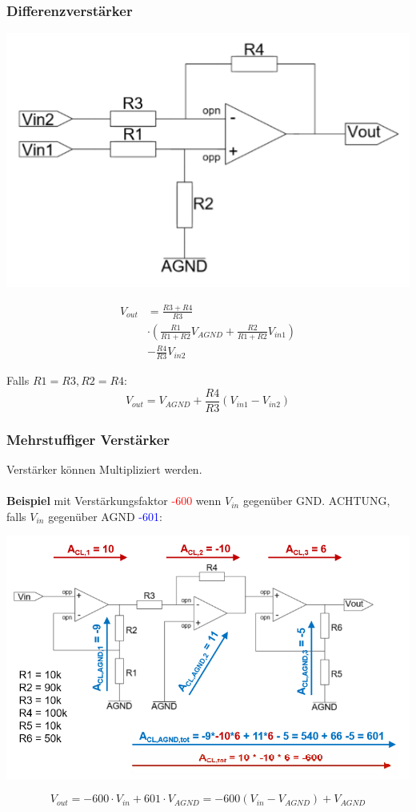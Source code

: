 \subsubsection{Differenzverstärker}
\begin{minipage}{0.20\textwidth}
	\includegraphics[width=\linewidth,keepaspectratio=true]{./Images/opamp_differenz}
\end{minipage}%
\begin{minipage}{0.30\textwidth}
	\begin{align*}
		V_{out} &= \frac{R3 +  R4}{R3} \\ &\cdot \left(\frac{R1}{R1 + R2}V_{AGND} + \frac{R2}{R1 + R2}V_{in1}\right) \\ &- \frac{R4}{R3}V_{in2}
	\end{align*}
\end{minipage}

Falls $R1=R3, R2=R4$: \[ V_{out} = V_{AGND}+ \frac{R4}{R3}(V_{in1} - V_{in2}) \]
 
\subsubsection{Mehrstuffiger Verstärker}
Verstärker können Multipliziert werden. \\
~\\\textbf{Beispiel }mit Verstärkungsfaktor \textcolor{red}{-600} wenn $V_{in}$ gegenüber GND. ACHTUNG, falls $V_{in}$ gegenüber AGND \textcolor{blue}{-601}:\\
\begin{center}
	\includegraphics[width=0.8\linewidth]{Images/opamp_mehrstufig}
\end{center}
\[
V_{out} = -600\cdot V_{in} + 601\cdot V_{AGND} = -600(V_{in} - V_{AGND}) + V_{AGND}
\]

